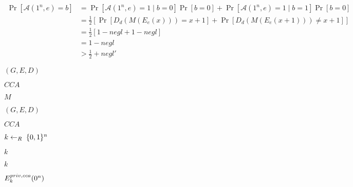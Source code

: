 \documentclass[10pt]{book}
\begin{document}
\begin{mdSnippets}
\begin{mdDisplaySnippet}[10c8ac5ffc133bb4514f977197c5787c]%
\[%
\begin{aligned}
\Pr[\mathcal{A}(1^n,e) = b] &= \Pr[\mathcal{A}(1^n,e) = 1 \mid b = 0]\Pr[b = 0] + \Pr[\mathcal{A}(1^n,e) =1 \mid b = 1]\Pr[b = 0] \\
&= \frac{1}{2}[\Pr[D_d(M(E_e(x))) = x + 1] + \Pr[D_d(M(E_e(x+1))) \neq x + 1]] \\
&= \frac{1}{2}[1 - negl + 1 - negl] \\
&= 1 - negl \\
&> \frac{1}{2} + negl'
\end{aligned}
\]%
\end{mdDisplaySnippet}%
\begin{mdInlineSnippet}[b85e5fef323d7d3cb0465e35e6d6d405]%
$(G,E,D)$\end{mdInlineSnippet}%
\begin{mdInlineSnippet}[d8c072a439c55274f145eae9f6583751]%
$CCA$\end{mdInlineSnippet}%
\begin{mdInlineSnippet}[69691c7bdcc3ce6d5d8a1361f22d04ac]%
$M$\end{mdInlineSnippet}%
\begin{mdInlineSnippet}[b85e5fef323d7d3cb0465e35e6d6d405]%
$(G,E,D)$\end{mdInlineSnippet}%
\begin{mdInlineSnippet}[d8c072a439c55274f145eae9f6583751]%
$CCA$\end{mdInlineSnippet}%
\begin{mdInlineSnippet}[ddb420b47c1d9e702170664f39a03cf2]%
$k \leftarrow_R\;\{0,1\}^n$\end{mdInlineSnippet}%
\begin{mdInlineSnippet}[8ce4b16b22b58894aa86c421e8759df3]%
$k$\end{mdInlineSnippet}%
\begin{mdInlineSnippet}[8ce4b16b22b58894aa86c421e8759df3]%
$k$\end{mdInlineSnippet}%
\begin{mdInlineSnippet}%
$E^{priv,cca}_k(0^n)$\end{mdInlineSnippet}%
\begin{mdInlineSnippet}[8ce4b16b22b58894aa86c421e8759df3]%

\end{mdInlineSnippet}
\end{mdSnippets}
\end{document}
